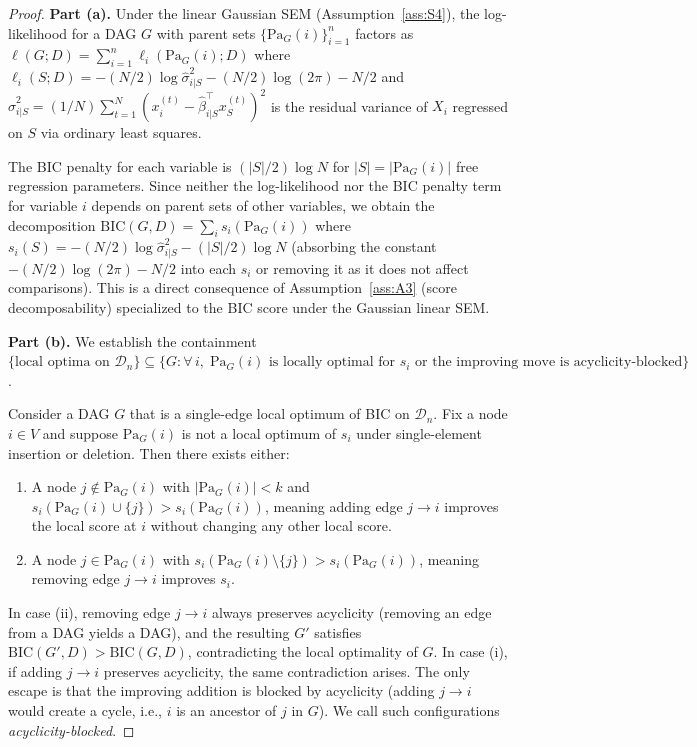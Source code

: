 \documentclass{article}
\theoremstyle{definition}
\theoremstyle{plain}
\theoremstyle{remark}
\begin{document}
\begin{proof}
\textbf{Part (a).} Under the linear Gaussian SEM (Assumption~\ref{ass:S4}), the log-likelihood
for a DAG $G$ with parent sets $\{\mathrm{Pa}_G(i)\}_{i=1}^n$ factors as
$\ell(G; D) = \sum_{i=1}^n \ell_i(\mathrm{Pa}_G(i); D)$ where
$\ell_i(S; D) = -(N/2)\log\hat{\sigma}^2_{i|S} - (N/2)\log(2\pi) - N/2$
and $\hat{\sigma}^2_{i|S} = (1/N)\sum_{t=1}^N (x_i^{(t)} - \hat{\beta}_{i|S}^\top x_S^{(t)})^2$
is the residual variance of $X_i$ regressed on $S$ via ordinary least squares.

The BIC penalty for each variable is $(|S|/2)\log N$ for $|S| = |\mathrm{Pa}_G(i)|$ free
regression parameters. Since neither the log-likelihood nor the BIC penalty term for
variable $i$ depends on parent sets of other variables, we obtain the decomposition
$\mathrm{BIC}(G, D) = \sum_i s_i(\mathrm{Pa}_G(i))$ where
$s_i(S) = -(N/2)\log\hat{\sigma}^2_{i|S} - (|S|/2)\log N$
(absorbing the constant $-(N/2)\log(2\pi) - N/2$ into each $s_i$ or removing it as it
does not affect comparisons). This is a direct consequence of Assumption~\ref{ass:A3}
(score decomposability) specialized to the BIC score under the Gaussian linear SEM.

\textbf{Part (b).} We establish the containment
$\{\text{local optima on } \mathcal{D}_n\} \subseteq
\{G : \forall\, i,\; \mathrm{Pa}_G(i) \text{ is locally optimal for } s_i
\text{ or the improving move is acyclicity-blocked}\}$.

Consider a DAG $G$ that is a single-edge local optimum of BIC on $\mathcal{D}_n$. Fix a node
$i \in V$ and suppose $\mathrm{Pa}_G(i)$ is not a local optimum of $s_i$ under
single-element insertion or deletion. Then there exists either:
\begin{enumerate}
  \item[(i)] A node $j \notin \mathrm{Pa}_G(i)$ with $|\mathrm{Pa}_G(i)| < k$ and
    $s_i(\mathrm{Pa}_G(i) \cup \{j\}) > s_i(\mathrm{Pa}_G(i))$, meaning adding edge
    $j \to i$ improves the local score at $i$ without changing any other local score.
  \item[(ii)] A node $j \in \mathrm{Pa}_G(i)$ with
    $s_i(\mathrm{Pa}_G(i) \setminus \{j\}) > s_i(\mathrm{Pa}_G(i))$, meaning removing
    edge $j \to i$ improves $s_i$.
\end{enumerate}

In case (ii), removing edge $j \to i$ always preserves acyclicity (removing an edge from a
DAG yields a DAG), and the resulting $G'$ satisfies $\mathrm{BIC}(G', D) > \mathrm{BIC}(G, D)$,
contradicting the local optimality of $G$. In case (i), if adding $j \to i$ preserves
acyclicity, the same contradiction arises. The only escape is that the improving addition is
blocked by acyclicity (adding $j \to i$ would create a cycle, i.e., $i$ is an ancestor of
$j$ in $G$). We call such configurations \emph{acyclicity-blocked}.


\end{proof}
\end{document}
